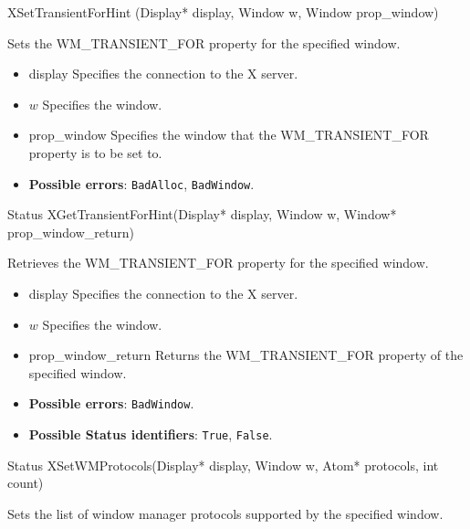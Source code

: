 \documentclass{report}
\begin{document}
\begin{itemize}
            \begin{cppcode}
            XSetTransientForHint (Display* display, Window w, Window prop_window)
            \end{cppcode}
            \bigbreak \noindent
            Sets the WM\_TRANSIENT\_FOR property for the specified window.

            \begin{itemize}
                \item display Specifies the connection to the X server.
                \item $w$ Specifies the window.
                \item prop\_window Specifies the window that the WM\_TRANSIENT\_FOR property is to be set to.
            \end{itemize}

            \begin{itemize}
                \item \textbf{Possible errors}: \texttt{BadAlloc}, \texttt{BadWindow}.
            \end{itemize}

            \begin{cppcode}
                Status XGetTransientForHint(Display* display, Window w, Window* prop\_window\_return)
            \end{cppcode}
            \bigbreak \noindent
            Retrieves the WM\_TRANSIENT\_FOR property for the specified window.

            \begin{itemize}
                \item display Specifies the connection to the X server.
                \item $w$ Specifies the window.
                \item prop\_window\_return Returns the WM\_TRANSIENT\_FOR property of the specified window.
            \end{itemize}

            \begin{itemize}
                \item \textbf{Possible errors}: \texttt{BadWindow}.
                \item \textbf{Possible Status identifiers}: \texttt{True}, \texttt{False}.
            \end{itemize}

            \begin{cppcode}
                Status XSetWMProtocols(Display* display, Window w, Atom* protocols, int count)
            \end{cppcode}
            \bigbreak \noindent
            Sets the list of window manager protocols supported by the specified window.


\end{itemize}
\end{document}
